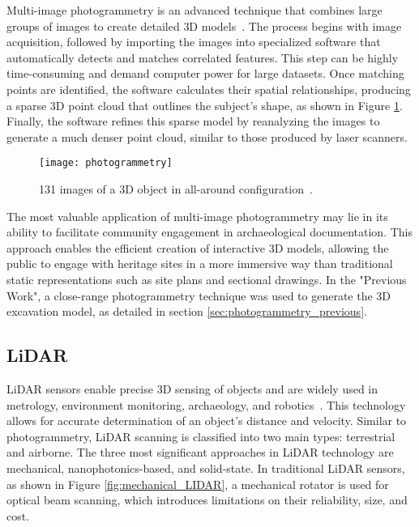 Multi-image photogrammetry is an advanced technique that combines large groups of images to create detailed \gls{3D} models~\cite{mccarthy2014multi}. The process begins with image acquisition, followed by importing 
the images into specialized software that automatically detects and matches correlated features. This step can be highly time-consuming and demand computer power for large datasets. 
Once matching points are identified, the software calculates their spatial relationships, producing a sparse \gls{3D} point cloud that outlines the subject’s shape, as shown in Figure \ref{fig:photo2}. 
Finally, the software refines this sparse model by reanalyzing the images to generate a much denser point cloud, similar to those produced by laser scanners.

\begin{figure}[h!]
    \centering
    \texttt{[image: photogrammetry]}
    \caption{131 images of a \gls{3D} object in all-around configuration~\cite{luhmann2016sensor}.}
    \label{fig:photo2}
\end{figure} 
\FloatBarrier

  
The most valuable application of multi-image photogrammetry
may lie in its ability to facilitate community engagement in archaeological documentation.
This approach enables the efficient creation of interactive \gls{3D} models, allowing the public to engage with heritage sites
in a more immersive way than traditional static representations such as site plans and sectional drawings. In the "Previous Work", a close-range photogrammetry technique was used to generate the \gls{3D} excavation model, as detailed in section \ref{sec:photogrammetry_previous}.

\subsection{LiDAR}
\label{sec:lidar}

\gls{LiDAR} sensors enable precise \gls{3D} sensing of objects and are widely used in metrology, environment monitoring, archaeology, and robotics~\cite{li2022progress}.
This technology allows for accurate determination of an object’s distance and velocity. 
Similar to photogrammetry, \gls{LiDAR} scanning is classified into two main types: terrestrial and airborne.
The three most significant approaches in \gls{LiDAR} technology are mechanical, nanophotonics-based, and solid-state.
In traditional \gls{LiDAR} sensors, as shown in Figure \ref{fig:mechanical_LIDAR}, a mechanical rotator is used for optical beam scanning, which introduces limitations on their reliability, size, and cost.


